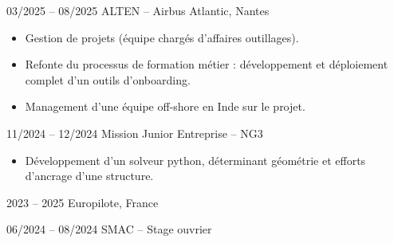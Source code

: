 

        {03/2025 -- 08/2025}
        {ALTEN -- Airbus Atlantic, Nantes}
        {%
          \begin{itemize}
            \item Gestion de projets (équipe chargés d'affaires outillages).
            \item Refonte du processus de formation métier : développement et déploiement complet d'un outils d'onboarding.
            \item Management d'une équipe off-shore en Inde sur le projet.
          \end{itemize}
        }


        {11/2024 -- 12/2024}
        {Mission Junior Entreprise -- NG3}
        {%
          \begin{itemize}
            \item Développement d'un solveur python, déterminant géométrie et efforts d'ancrage d'une structure.
          \end{itemize}
        }

        {2023 -- 2025}
        {Europilote, France}
        {
        }

        {06/2024 -- 08/2024}
        {SMAC -- Stage ouvrier}
        {}

